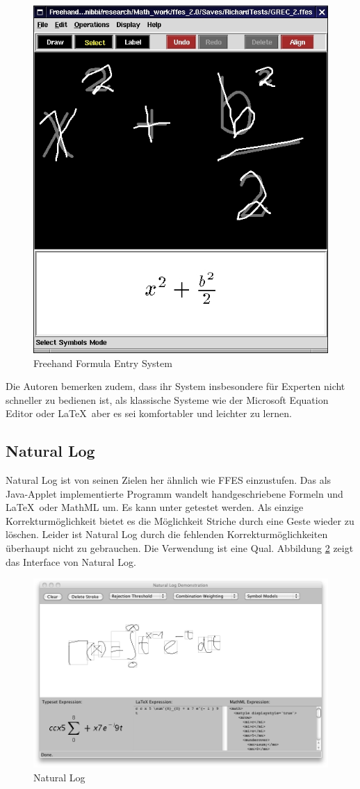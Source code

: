 \begin{figure}[htbp]
  \begin{center}
    \includegraphics[width=.5\textwidth]{figures/ffes.png}
  \end{center}
  \caption{Freehand Formula Entry System}
  \label{fig:ffes}
\end{figure}

Die Autoren bemerken zudem, dass ihr System insbesondere für Experten nicht schneller zu bedienen ist, als klassische Systeme wie der Microsoft Equation Editor oder \LaTeX~aber es sei komfortabler und leichter zu lernen.

\subsection{Natural Log}
\label{sub:natural-log}

Natural Log ist von seinen Zielen her ähnlich wie FFES einzustufen. Das als Java-Applet implementierte Programm wandelt handgeschriebene Formeln und \LaTeX~oder MathML um. Es kann unter \cite{natural-log} getestet werden. Als einzige Korrekturmöglichkeit bietet es die Möglichkeit Striche durch eine Geste wieder zu löschen. Leider ist Natural Log durch die fehlenden Korrekturmöglichkeiten überhaupt nicht zu gebrauchen. Die Verwendung ist eine Qual. Abbildung \ref{fig:natural-log} zeigt das Interface von Natural Log.

\begin{figure}[htbp]
  \begin{center}
    \includegraphics[width=.8\textwidth]{figures/natural-log.png}
  \end{center}
  \caption{Natural Log}
  \label{fig:natural-log}
\end{figure}

